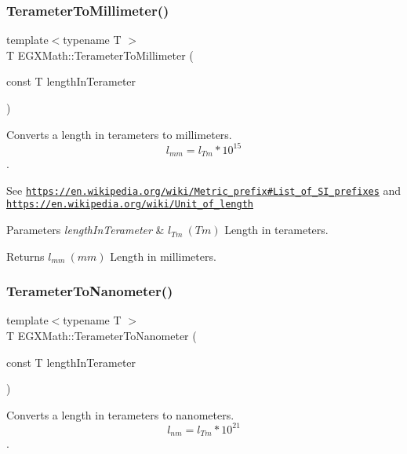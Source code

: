 \subsubsection{\texorpdfstring{Terameter\+To\+Millimeter()}{TerameterToMillimeter()}}
{\footnotesize\ttfamily template$<$typename T $>$ \\
T E\+G\+X\+Math\+::\+Terameter\+To\+Millimeter (\begin{DoxyParamCaption}\item[{const T}]{length\+In\+Terameter }\end{DoxyParamCaption})}



Converts a length in terameters to millimeters. \[ l_{mm}=l_{Tm} * 10^{15} \]. 

See \href{https://en.wikipedia.org/wiki/Metric_prefix#List_of_SI_prefixes}{\tt https\+://en.\+wikipedia.\+org/wiki/\+Metric\+\_\+prefix\#\+List\+\_\+of\+\_\+\+S\+I\+\_\+prefixes} and \href{https://en.wikipedia.org/wiki/Unit_of_length}{\tt https\+://en.\+wikipedia.\+org/wiki/\+Unit\+\_\+of\+\_\+length} 
\begin{DoxyParams}{Parameters}
{\em length\+In\+Terameter} & $ l_{Tm}\ (Tm)$ Length in terameters. \\
\hline
\end{DoxyParams}
\begin{DoxyReturn}{Returns}
$ l_{mm}\ (mm)$ Length in millimeters. 
\end{DoxyReturn}
\mbox{\label{group___e_g_x_math-_conversions-_length_conversions-_s_i-_terameter-_s_i_ga01da3f80c1d7cf73956140fa84ad615c}} 
\subsubsection{\texorpdfstring{Terameter\+To\+Nanometer()}{TerameterToNanometer()}}
{\footnotesize\ttfamily template$<$typename T $>$ \\
T E\+G\+X\+Math\+::\+Terameter\+To\+Nanometer (\begin{DoxyParamCaption}\item[{const T}]{length\+In\+Terameter }\end{DoxyParamCaption})}



Converts a length in terameters to nanometers. \[ l_{nm}=l_{Tm} * 10^{21} \]. 

